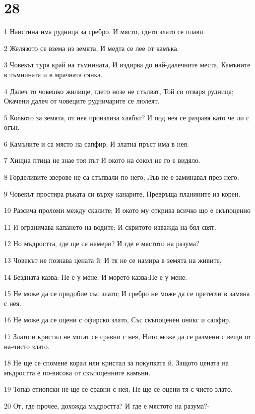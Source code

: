 \chapter{28}

\par 1 Наистина има рудница за сребро, И място, гдето злато се плави.
\par 2 Желязото се взема из земята, И медта се лее от камъка.
\par 3 Човекът туря край на тъмнината, И издирва до най-далечните места, Камъните в тъмнината и в мрачната сянка.
\par 4 Далеч то човешко жилище, гдето нозе не стъпват, Той си отваря рудница; Окачени далеч от човеците рудничарите се люлеят.
\par 5 Колкото за земята, от нея произлиза хлябът? И под нея се разравя като че ли с огън.
\par 6 Камъните и са място на сапфир, И златна пръст има в нея.
\par 7 Хищна птица не знае тоя път И окото на сокол не го е видяло.
\par 8 Горделивите зверове не са стъпвали по него; Лъв не е заминавал през него.
\par 9 Човекът простира ръката си върху канарите, Превръща планините из корен.
\par 10 Разсича проломи между скалите; И окото му открива всичко що е скъпоценно
\par 11 И ограничава капането на водите; И скритото изважда на бял свят.
\par 12 Но мъдростта, где ще се намери? И где е мястото на разума?
\par 13 Човекът не познава цената й; И тя не се намира в земята на живите,
\par 14 Бездната казва: Не е у мене. И морето казва:Не е у мене.
\par 15 Не може да се придобие със злато; И сребро не може да се претегли в замяна с нея.
\par 16 Не може да се оцени с офирско злато, Със скъпоценен оникс и сапфир.
\par 17 Злато и кристал не могат се сравни с нея, Нито може да се размени с вещи от на-чисто злато.
\par 18 Не ще се спомене корал или кристал за покупката й. Защото цената на мъдростта е по-висока от скъпоценните камъни.
\par 19 Топаз етиопски не ще се сравни с нея; Не ще се оцени тя с чисто злато.
\par 20 От, где прочее, дохожда мъдростта? И где е мястото на разума?-
